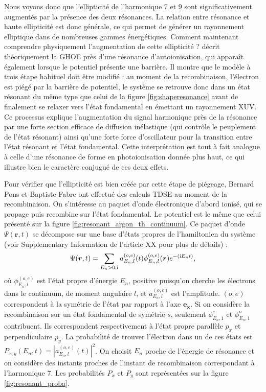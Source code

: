 Nous voyons donc que l'ellipticité de l'harmonique 7 et 9 sont significativement augmentés par la présence des deux résonances. La relation entre résonance et haute ellipticité est donc générale, ce qui permet de générer un rayonnement elliptique dans de nombreuses gammes énergétiques. Comment maintenant comprendre physiquement l'augmentation de cette ellipticité ?  décrit théoriquement la GHOE près d'une résonance d'autoionisation, qui apparaît également lorsque le potentiel présente une barrière. Il montre que le modèle à trois étape habituel doit être modifié : au moment de la recombinaison, l'électron est piégé par la barrière de potentiel, le système se retrouve donc dans un état résonant du même type que celui de la figure \ref{fig:shaperesonance} avant de finalement se relaxer vers l'état fondamental en émettant un rayonnement XUV. Ce processus explique l'augmentation du signal harmonique près de la résonance par une forte section efficace de diffusion inélastique (qui contrôle le peuplement de l'état résonant) ainsi qu'une forte force d'oscillateur pour la transition entre l'état résonant et l'état fondamental.
Cette interprétation est tout à fait analogue à celle d'une résonance de forme en photoionisation donnée plus haut, ce qui illustre bien le caractère conjugué de ces deux effets.

Pour vérifier que l'ellipticité est bien créée par cette étape de piégeage, Bernard Pons et Baptiste Fabre ont effectué des calculs TDSE au moment de la recombinaison. On s'intéresse au paquet d'onde électronique d'abord ionisé, qui se propage puis recombine sur l'état fondamental. Le potentiel est le même que celui présenté sur la figure \ref{fig:resonant_argon_th_continuum}. Ce paquet d'onde $\Psi(\bm{r},t)$ se décompose sur une base d'états propres de l'hamiltonien du système (voir Supplementary Information de l'article XX pour plus de détails) :
\[ \Psi(\bm{r},t)=\sum_{E_n>0,l} a_{E_n,l}^{(o,e)}(t)\phi_{E_n,l}^{(o,e)}(\bm{r})e^{-(\mathrm{i} E_n t)},\]
où $\phi_{E_n,l}^{(o,e)}$ est l'état propre d'énergie $E_n$, positive puisqu'on cherche les électrons dans le continuum, de moment angulaire $l$, et $a_{E_n,l}^{(o,e)}$ est l'amplitude. $(o,e)$ correspondent à la symétrie de l'état par rapport à l'axe $\bm{e_x}$. Si on considère la recombinaison sur un état fondamental de symétrie $s$, seulement $\phi_{E_n,1}^{e}$ et $\phi_{E_n,1}^{o}$ contribuent. Ils correspondent respectivement à l'état propre parallèle $p_x$ et perpendiculaire $p_y$. La probabilité de trouver l'électron dans un de ces états est $P_{x,y}(E_n,t) = |a_{E_n,l}^{(o,e)}(t)|^2$. On choisit $E_n$ proche de l'énergie de résonance et on considère des instants proches de l'instant de recombinaison correspondant à l'harmonique 7. Les probabilités $P_x$ et $P_y$ sont représentées sur la figure \ref{fig:resonant_proba}.

